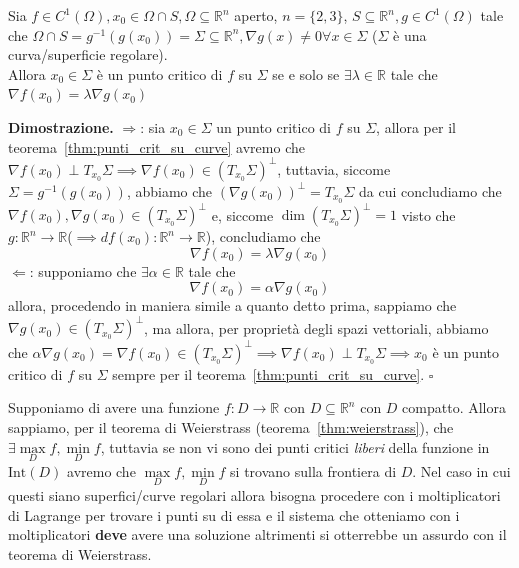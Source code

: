 \vspace{0.5cm}
\begin{theorem}[\textcolor{blue}{Dei moltiplicatori di Lagrange}]
Sia $f \in C^{1} (\Omega), x_0 \in \Omega \cap S, \Omega \subseteq \mathbb{R}^n$ aperto, $n= \{ 2, 3 \}$, $S \subseteq \mathbb{R}^n, g \in C^1 (\Omega)$ tale che $\Omega \cap S = g^{-1}(g(x_0)) = \Sigma \subseteq \mathbb{R}^n, \nabla g(x) \neq 0 \forall x \in \Sigma$ ($\Sigma$ è una curva/superficie regolare). \\
Allora $x_0 \in \Sigma$ è un punto critico di $f$ su $\Sigma$ se e solo se $\exists \lambda \in \mathbb{R}$ tale che $\nabla f(x_0) = \lambda \nabla g(x_0)$
\end{theorem}

\noindent \textbf{Dimostrazione. }
$\boxed{\Rightarrow}$: sia $x_0 \in \Sigma$ un punto critico di $f$ su $\Sigma$, allora per il teorema~\ref{thm:punti_crit_su_curve}  avremo che $\nabla f(x_0) \perp T_{x_0} \Sigma \implies \nabla f(x_0) \in (T_{x_0} \Sigma)^{\perp}$, tuttavia, siccome $\Sigma = g^{-1}(g(x_0))$, abbiamo che $(\nabla g(x_0))^{\perp} = T_{x_0} \Sigma$ da cui concludiamo che $\nabla f(x_0), \nabla g(x_0) \in (T_{x_0} \Sigma)^{\perp}$ e, siccome $\dim{(T_{x_0} \Sigma)^{\perp}} = 1$ visto che $g: \mathbb{R}^n \to \mathbb{R}$($\implies df(x_0): \mathbb{R}^n \to \mathbb{R}$), concludiamo che 
$$
\nabla f(x_0) = \lambda \nabla g(x_0)
$$
$\boxed{\Leftarrow}$: supponiamo che $\exists \alpha \in \mathbb{R}$ tale che
$$
\nabla f(x_0) = \alpha \nabla g(x_0)
$$
allora, procedendo in maniera simile a quanto detto prima, sappiamo che $\nabla g(x_0) \in (T_{x_0} \Sigma)^{\perp}$, ma allora, per proprietà degli spazi vettoriali, abbiamo che $\alpha \nabla g(x_0) = \nabla f(x_0) \in (T_{x_0} \Sigma)^{\perp} \implies \nabla f(x_0) \perp T_{x_0} \Sigma \implies x_0$ è un punto critico di $f$ su $\Sigma$ sempre per il teorema~\ref{thm:punti_crit_su_curve}.
\hfill $\square$

\begin{remark}
Supponiamo di avere una funzione $f: D \to \mathbb{R}$ con $D \subseteq \mathbb{R}^n$ con $D$ compatto. Allora sappiamo, per il teorema di Weierstrass (teorema~\ref{thm:weierstrass}), che $\exists \max\limits_{D} f, \min\limits_{D} f$, tuttavia se non vi sono dei punti critici \emph{liberi} della funzione in $\text{Int}(D)$ avremo che $\max\limits_{D} f, \min\limits_{D} f$ si trovano sulla frontiera di $D$. Nel caso in cui questi siano superfici/curve regolari allora bisogna procedere con i moltiplicatori di Lagrange per trovare i punti su di essa e il sistema che otteniamo con i moltiplicatori \textbf{deve} avere una soluzione altrimenti si otterrebbe un assurdo con il teorema di Weierstrass.
\end{remark}

